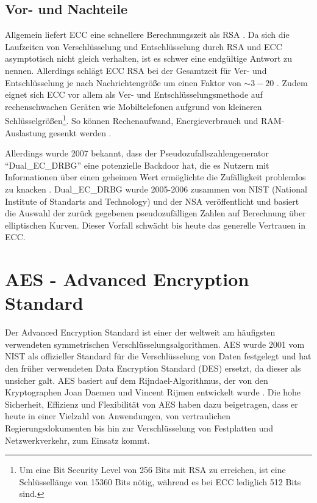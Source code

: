 \documentclass[
	fontsize=11pt,
	headings=small,
	parskip=half,           %
	bibliography=totoc,
	numbers=noenddot,       %
	open=any,               %
]{scrreprt}
\begin{document}
\subsection{Vor- und Nachteile}
Allgemein liefert ECC eine schnellere Berechnungszeit als RSA \cite{ecc-mahto2018performance}. Da sich die Laufzeiten von Verschlüsselung und Entschlüsselung durch RSA und ECC asymptotisch nicht gleich verhalten, ist es schwer eine endgültige Antwort zu nennen. Allerdings schlägt ECC RSA bei der Gesamtzeit für Ver- und Entschlüsselung je nach Nachrichtengröße um einen Faktor von $\mathtt{\sim}3-20$ \cite{ecc-mahto2018performance, ecc-bao2022research}. Zudem eignet sich ECC vor allem als Ver- und Entschlüsselungsmethode auf rechenschwachen Geräten wie Mobiltelefonen aufgrund von kleineren Schlüsselgrößen\footnote{Um eine Bit Security Level von 256 Bits mit RSA zu erreichen, ist eine Schlüssellänge von 15360 Bits nötig, während es bei ECC lediglich 512 Bits sind.\cite{ecc-mahto2018performance}}. So können Rechenaufwand, Energieverbrauch und RAM-Auslastung gesenkt werden \cite{ecc-gupta2011ecc}.

Allerdings wurde 2007 bekannt, dass der Pseudozufallszahlengenerator ``Dual\_EC\_DRBG'' eine potenzielle Backdoor hat, die es Nutzern mit Informationen über einen geheimen Wert ermöglichte die Zufälligkeit problemlos zu knacken \cite{ecc-green2013backdoor}. Dual\_EC\_DRBG wurde 2005-2006 zusammen von NIST (National Institute of Standarts and Technology) und der NSA veröffentlicht und basiert die Auswahl der zurück gegebenen pseudozufälligen Zahlen auf Berechnung über elliptischen Kurven. Dieser Vorfall schwächt bis heute das generelle Vertrauen in ECC. \cite{ecc-cloud2013elliptic}

\section{AES - Advanced Encryption Standard}
\label{sec:aes}
Der Advanced Encryption Standard ist einer der weltweit am häufigsten verwendeten symmetrischen Verschlüsselungsalgorithmen. AES wurde 2001 vom NIST als offizieller Standard für die Verschlüsselung von Daten festgelegt und hat den früher verwendeten Data Encryption Standard (DES) ersetzt, da dieser als unsicher galt. AES basiert auf dem Rijndael-Algorithmus, der von den Kryptographen Joan Daemen und Vincent Rijmen entwickelt wurde \cite{aes-jamil2004rijndael}. Die hohe Sicherheit, Effizienz und Flexibilität von AES haben dazu beigetragen, dass er heute in einer Vielzahl von Anwendungen, von vertraulichen Regierungsdokumenten bis hin zur Verschlüsselung von Festplatten und Netzwerkverkehr, zum Einsatz kommt.
\end{document}
